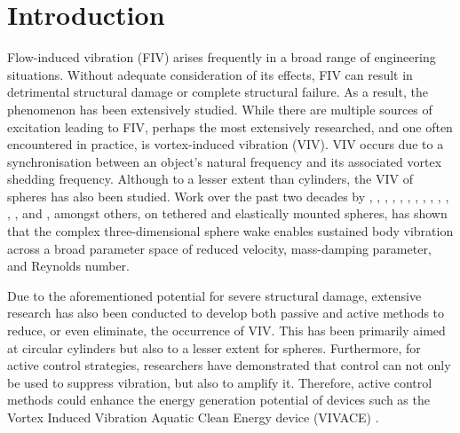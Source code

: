 \documentclass[3p]{elsarticle}
\begin{document}

\section{Introduction}%
\label{sec:Intro}%
Flow-induced vibration (FIV) arises frequently in a broad range of
engineering situations. 
Without adequate consideration of its effects, FIV can result in detrimental structural damage or complete structural failure. 
As a result, the phenomenon has been extensively studied. 
While there are multiple sources of excitation leading to FIV, perhaps the most extensively researched, and one often encountered in practice, is vortex-induced vibration (VIV). 
VIV occurs due to a synchronisation between an object's natural frequency and its associated vortex shedding frequency. 
Although to a lesser extent than cylinders, the VIV of spheres has also been studied. 
Work over the past two decades by \citet{Williamson1997}, \citet{Govardhan1997}, \citet{Jauvtis2001}, \citet{Govardhan2005}, \citet{vanHout2010}, \citet{Behara2011}, \citet{Eshbal2012}, \citet{vanHout2013}, \citet{Krakovich2013}, \citet{Lee2013}, \citet{Behara2016}, \citet{Rajamuni2018a}, \citet{Sareen2018c}, and \citet{Eshbal2019}, amongst others, on tethered and elastically mounted spheres, has shown that the complex three-dimensional sphere wake enables sustained body vibration across a broad parameter space of reduced velocity, mass-damping parameter, and Reynolds number.

Due to the aforementioned potential for severe structural damage,
extensive research has also been conducted to develop both passive and active methods to reduce, or
even eliminate, the occurrence of VIV. This has been primarily aimed at circular cylinders but also to a lesser extent for spheres. Furthermore, for
active control strategies, researchers have demonstrated
that control can not only be used to suppress vibration, but also to
amplify it. Therefore, active control methods could 
enhance the energy generation potential of devices such as
the Vortex Induced Vibration Aquatic Clean Energy device (VIVACE)
\citep{Bernitsas2008}. 
\end{document}
